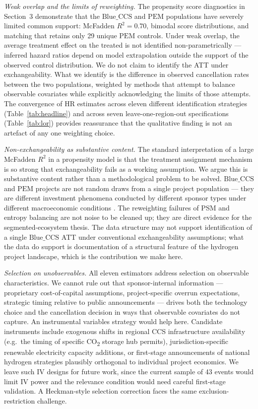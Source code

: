 \documentclass[review,authoryear,11pt]{elsarticle}
\newcommand{\HR}{\mathrm{HR}}
\newcommand{\BlueCCS}{\mathrm{Blue\_CCS}}
\newcommand{\PEM}{\mathrm{PEM}}
\begin{document}
\textit{Weak overlap and the limits of reweighting.} The propensity score diagnostics in Section~3 demonstrate that the $\BlueCCS$ and $\PEM$ populations have severely limited common support: McFadden $R^2 = 0.70$, bimodal score distributions, and matching that retains only 29 unique $\PEM$ controls. Under weak overlap, the average treatment effect on the treated is not identified non-parametrically --- inferred hazard ratios depend on model extrapolation outside the support of the observed control distribution. We do not claim to identify the ATT under exchangeability. What we identify is the difference in observed cancellation rates between the two populations, weighted by methods that attempt to balance observable covariates while explicitly acknowledging the limits of those attempts. The convergence of $\HR$ estimates across eleven different identification strategies (Table~\ref{tab:headline}) and across seven leave-one-region-out specifications (Table~\ref{tab:lor}) provides reassurance that the qualitative finding is not an artefact of any one weighting choice.

\textit{Non-exchangeability as substantive content.} The standard interpretation of a large McFadden $R^2$ in a propensity model is that the treatment assignment mechanism is so strong that exchangeability fails as a working assumption. We argue this is substantive content rather than a methodological problem to be solved. $\BlueCCS$ and $\PEM$ projects are not random draws from a single project population --- they are different investment phenomena conducted by different sponsor types under different macroeconomic conditions \citep{ImbensRubin2015}. The reweighting failures of PSM and entropy balancing are not noise to be cleaned up; they are direct evidence for the segmented-ecosystem thesis. The data structure may not support identification of a single $\BlueCCS$ ATT under conventional exchangeability assumptions; what the data do support is documentation of a structural feature of the hydrogen project landscape, which is the contribution we make here.

\textit{Selection on unobservables.} All eleven estimators address selection on observable characteristics. We cannot rule out that sponsor-internal information --- proprietary cost-of-capital assumptions, project-specific overrun expectations, strategic timing relative to public announcements --- drives both the technology choice and the cancellation decision in ways that observable covariates do not capture. An instrumental variables strategy would help here. Candidate instruments include exogenous shifts in regional CCS infrastructure availability (e.g.\ the timing of specific CO\textsubscript{2} storage hub permits), jurisdiction-specific renewable electricity capacity additions, or first-stage announcements of national hydrogen strategies plausibly orthogonal to individual project economics. We leave such IV designs for future work, since the current sample of 43 events would limit IV power and the relevance condition would need careful first-stage validation. A Heckman-style selection correction \citep{Heckman1979} faces the same exclusion-restriction challenge.
\end{document}

